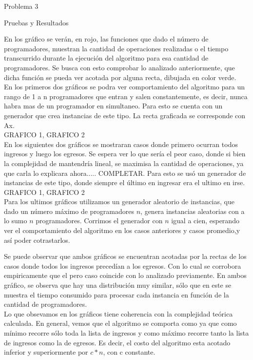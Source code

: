 \begin{section}{Problema 3}
\begin{subsection}{Pruebas y Resultados}
		
	En los gráfico se verán, en rojo, las funciones que dado el número de programadores, muestran la cantidad de operaciones realizadas o el tiempo transcurrido durante la ejecución del algoritmo para esa cantidad de programadores. Se busca con esto comprobar lo analizado anteriormente, que dicha función se pueda ver acotada por alguna recta, dibujada en color verde.
\\
	En los primeros dos gráficos se podra ver comportamiento del algoritmo para un rango de 1 a n programadores que entran y salen constantemente, es decir, nunca habra mas de un programador en simultaneo. Para esto se cuenta con un generador que crea instancias de este tipo. La recta graficada se corresponde con Ax. 
\\	
	GRAFICO 1, GRAFICO 2
\\
	En los siguientes dos gráficos se mostraran casos donde primero ocurran todos ingresos y luego los egresos. Se espera ver lo que sería el peor caso, donde si bien la complejidad de mantendría lineal, se maximisa la cantidad de operaciones, ya que carla lo explicara ahora..... COMPLETAR. Para esto se usó un generador de instancias de este tipo, donde siempre el último en ingresar era el ultimo en irse.
\\
	GRAFICO 1, GRAFICO 2
\\

	Para los ultimos gráficos utilizamos un generador aleatorio de instancias, que dado un número máximo de programadores $n$, genera instancias aleatorias con a lo sumo $n$ programadores. Corrimos el generador con $n$ igual a cien, esperando ver el comportamiento del algoritmo en los casos anteriores y casos promedio,y así poder cotrastarlos.


	\VSP

	
	
	\VSP

	
	 Se puede observar que ambos gráficos se encuentran acotadas por la rectas de los casos donde todos los ingresos precedían a los egresos. Con lo cual se corrobora empiricamente que el pero caso coincide con lo analizado previamente. 
	En ambos gráfico, se observa que hay una distribución muy similar, sólo que en este se muestra el tiempo consumido para procesar cada instancia en función de la cantidad de programadores.\\

	Lo que obsevamos en los gráficos tiene coherencia con la complejidad teórica calculada. 
	En general, vemos que el algoritmo se comporta como  ya que como mínimo recorre sólo toda la lista de ingresos y como máximo recorre tanto la lista de ingresos como la de egresos. Es decir, el costo del algoritmo esta acotado inferior y superiormente por $c*n$, con c constante.

	\newpage

	\end{subsection}

\end{section}







